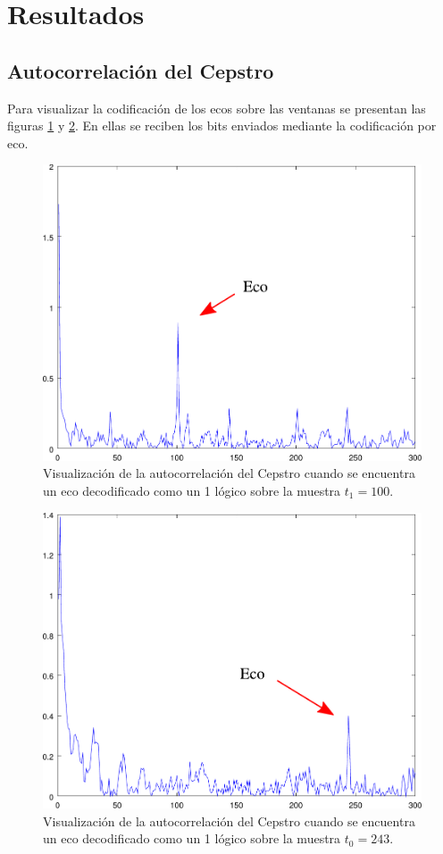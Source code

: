 \documentclass[conference]{IEEEtran}
\begin{document}
\section{Resultados}
\subsection{Autocorrelación del Cepstro}
Para visualizar la codificación de los ecos sobre las ventanas se presentan las figuras \ref{fig:rcc1} y \ref{fig:rcc0}. En ellas se reciben los bits enviados mediante la codificación por eco.

\begin{figure}
\centering
\includegraphics[scale=0.4]{rcc.pdf}
\caption{Visualización de la autocorrelación del Cepstro cuando se encuentra un eco decodificado como un 1 lógico sobre la muestra $t_1=100$.}
\label{fig:rcc1}
\end{figure}

\begin{figure}
\centering
\includegraphics[scale=0.4]{rcc_0.pdf}
\caption{Visualización de la autocorrelación del Cepstro cuando se encuentra un eco decodificado como un 1 lógico sobre la muestra $t_0=243$.}
\label{fig:rcc0}
\end{figure}
\end{document}
